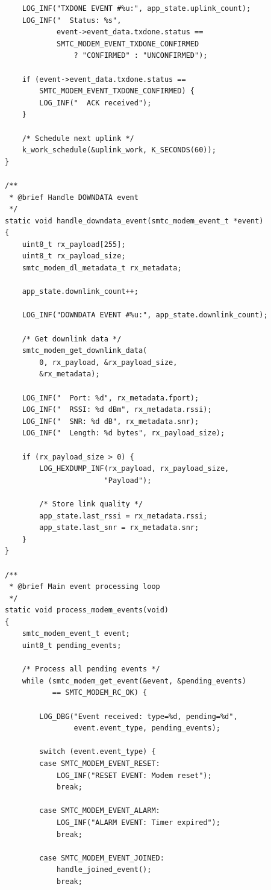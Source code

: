 \documentclass[11pt,a4paper]{article}
\begin{document}
\begin{solutionbox}
\begin{lstlisting}
    LOG_INF("TXDONE EVENT #%u:", app_state.uplink_count);
    LOG_INF("  Status: %s",
            event->event_data.txdone.status ==
            SMTC_MODEM_EVENT_TXDONE_CONFIRMED
                ? "CONFIRMED" : "UNCONFIRMED");

    if (event->event_data.txdone.status ==
        SMTC_MODEM_EVENT_TXDONE_CONFIRMED) {
        LOG_INF("  ACK received");
    }

    /* Schedule next uplink */
    k_work_schedule(&uplink_work, K_SECONDS(60));
}

/**
 * @brief Handle DOWNDATA event
 */
static void handle_downdata_event(smtc_modem_event_t *event)
{
    uint8_t rx_payload[255];
    uint8_t rx_payload_size;
    smtc_modem_dl_metadata_t rx_metadata;

    app_state.downlink_count++;

    LOG_INF("DOWNDATA EVENT #%u:", app_state.downlink_count);

    /* Get downlink data */
    smtc_modem_get_downlink_data(
        0, rx_payload, &rx_payload_size,
        &rx_metadata);

    LOG_INF("  Port: %d", rx_metadata.fport);
    LOG_INF("  RSSI: %d dBm", rx_metadata.rssi);
    LOG_INF("  SNR: %d dB", rx_metadata.snr);
    LOG_INF("  Length: %d bytes", rx_payload_size);

    if (rx_payload_size > 0) {
        LOG_HEXDUMP_INF(rx_payload, rx_payload_size,
                       "Payload");

        /* Store link quality */
        app_state.last_rssi = rx_metadata.rssi;
        app_state.last_snr = rx_metadata.snr;
    }
}

/**
 * @brief Main event processing loop
 */
static void process_modem_events(void)
{
    smtc_modem_event_t event;
    uint8_t pending_events;

    /* Process all pending events */
    while (smtc_modem_get_event(&event, &pending_events)
           == SMTC_MODEM_RC_OK) {

        LOG_DBG("Event received: type=%d, pending=%d",
                event.event_type, pending_events);

        switch (event.event_type) {
        case SMTC_MODEM_EVENT_RESET:
            LOG_INF("RESET EVENT: Modem reset");
            break;

        case SMTC_MODEM_EVENT_ALARM:
            LOG_INF("ALARM EVENT: Timer expired");
            break;

        case SMTC_MODEM_EVENT_JOINED:
            handle_joined_event();
            break;


\end{lstlisting}
\end{solutionbox}
\end{document}
